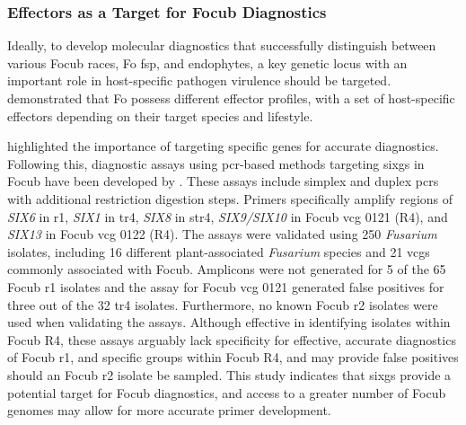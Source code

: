\subsubsection{Effectors as a Target for \acl{Focub} Diagnostics}

Ideally, to develop molecular diagnostics that successfully distinguish between various \ac{Focub} races, \ac{Fo} \ac{fsp}, and endophytes, a key genetic locus with an important role in host-specific pathogen virulence should be targeted. \textcite{Dam2016,constantin2021number} demonstrated that \ac{Fo} possess different effector profiles, with a set of host-specific effectors depending on their target species and lifestyle.  

\textcite{Magdama2019} highlighted the importance of targeting specific genes for accurate diagnostics. Following this, diagnostic assays using \ac{pcr}-based methods targeting \acp{sixg} in \ac{Focub} have been developed by \textcite{Carvalhais2019}. These assays include simplex and duplex \acp{pcr} with additional restriction digestion steps. Primers specifically amplify regions of \textit{SIX6} in \ac{r1}, \textit{SIX1} in \ac{tr4}, \textit{SIX8} in \ac{str4}, \textit{SIX9/SIX10} in \ac{Focub} \ac{vcg} 0121 (R4), and \textit{SIX13} in \ac{Focub} \ac{vcg} 0122 (R4). The assays were validated using 250 \textit{Fusarium} isolates, including 16 different plant-associated \textit{Fusarium} species and 21 \acp{vcg}  commonly associated with \ac{Focub}. Amplicons were not generated for 5 of the 65 \ac{Focub} \ac{r1} isolates and the assay for \ac{Focub} \ac{vcg} 0121 generated false positives for three out of the 32 \ac{tr4} isolates. Furthermore, no known \ac{Focub} \ac{r2} isolates were used when validating the assays. Although effective in identifying isolates within \ac{Focub} R4, these assays arguably lack specificity for effective, accurate diagnostics of \ac{Focub} \ac{r1}, and specific groups within \ac{Focub} R4, and may provide false positives should an \ac{Focub} \ac{r2} isolate be sampled. This study indicates that \acp{sixg} provide a potential target for \ac{Focub} diagnostics, and access to a greater number of \ac{Focub} genomes may allow for more accurate primer development.  


